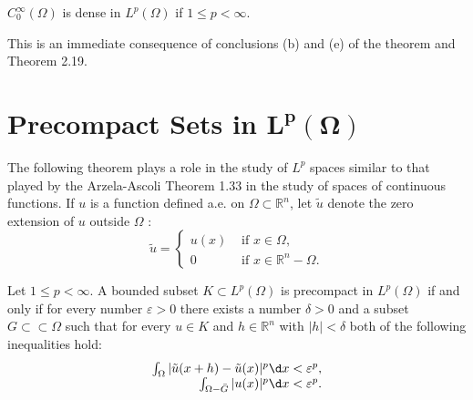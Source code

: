 \begin{corollary}
  $C_0^{\infty}(\Omega)$ is dense in $L^p(\Omega)$ if $1 \leq p<\infty$.
\end{corollary}

This is an immediate consequence of conclusions (b) and (e) of the theorem and Theorem 2.19.


\section[Precompact Sets in \texorpdfstring{$L^p(\Omega)}{L\textasciicircum p(Ω)}$]{Precompact Sets in $\bm{L^p(\Omega)}$}


\begin{para}
  The following theorem plays a role in the study of $L^p$ spaces similar to that played by the Arzela-Ascoli Theorem 1.33 in the study of spaces of continuous functions. If $u$ is a function defined a.e. on $\Omega \subset \mathbb{R}^n$, let $\tilde{u}$ denote the zero extension of $u$ outside $\Omega$ :
  \[
  \tilde{u} =
  \begin{cases}
    u(x) & \text { if } x \in \Omega, \\ 
    0 & \text { if } x \in \mathbb{R}^n-\Omega.
  \end{cases}
  \]
\end{para}

\begin{theorem}
  Let $1 \leq p<\infty$. A bounded subset $K \subset L^p(\Omega)$ is precompact in $L^p(\Omega)$ if and only if for every number $\varepsilon>0$ there exists a number $\delta>0$ and a subset $G \subset\subset \Omega$ such that for every $u \in K$ and $h \in \mathbb{R}^n$ with $|h|<\delta$ both of the following inequalities hold:
  \[
  \begin{array}{r}
  \int_{\Omega}|\tilde{u}(x+h)-\tilde{u}(x)|^p \d x<\varepsilon^p, \\
  \int_{\Omega-\bar{G}}|u(x)|^p \d x<\varepsilon^p .
  \end{array}
  \]
\end{theorem}

